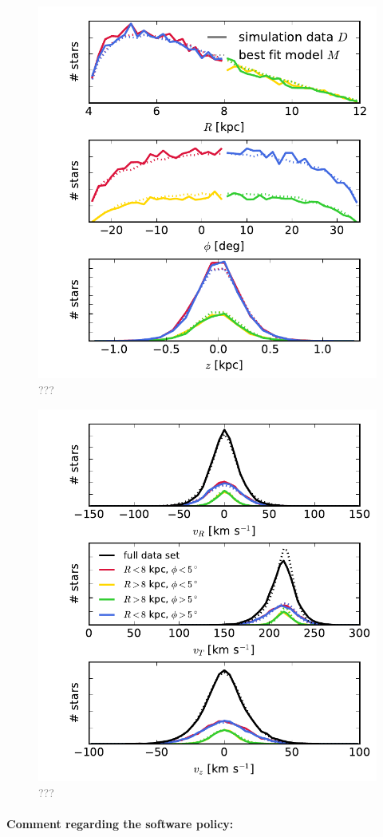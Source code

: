 \documentclass[10pt,a4paper]{article}
\newcommand{\Answer}[1]{\textcolor{Gray}{#1}}
\begin{document}
\begin{figure}[!htbp]
\centering
\includegraphics[width=0.7\columnwidth]{fig/MNdHHinit_4kpc8Spiral_a_test1_data_bestfit_residuals_3b.pdf}
\caption{\Answer{???}}
\end{figure}

\begin{figure}[!htbp]
\centering
\includegraphics[width=0.7\columnwidth]{fig/MNdHHinit_4kpc8Spiral_a_test1_data_bestfit_residuals_3c.pdf}
\caption{\Answer{???}}
\end{figure}


\paragraph{Comment regarding the software policy:}
\end{document}
